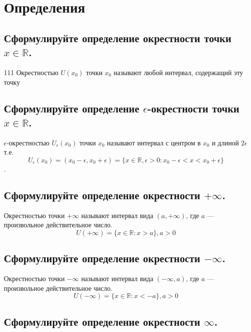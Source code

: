 




\section{Определения}
    \subsection{Сформулируйте определение окрестности точки $x \in \mathbb{R}$.}
    111
    Окрестностью $U(x_0)$ точки $x_0$ называют любой интервал, содержащий эту точку

    \subsection{Сформулируйте определение $\epsilon$-окрестности точки $x \in \mathbb{R}$. }

    $\epsilon$-окрестностью $U_\epsilon(x_0)$ точки $x_0$ называют интервал с центром в 
    $x_0$ и длиной $2\epsilon$ т.е. $$U_\epsilon(x_0) = (x_0 - \epsilon, x_0 + \epsilon) = 
    \{x \in \mathbb{R},  \epsilon>0 : x_0 - \epsilon < x < x_0 + \epsilon\}$$.

    \subsection{Сформулируйте определение окрестности $+\infty$. }

    Окрестностью точки $+\infty$ называют интервал вида $(a, +\infty)$, где $a$ — произвольное действительное число.
    $$U(+\infty) = \{x \in \mathbb{R}: x > a\}, a > 0$$

    \subsection{Сформулируйте определение окрестности $-\infty$. }

    Окрестностью точки $-\infty$ называют интервал вида $(-\infty, a)$, где $a$ — произвольное действительное число.
    $$U(-\infty) = \{x \in \mathbb{R}: x < -a\}, a > 0$$

    \subsection{Сформулируйте определение окрестности $\infty$. }

